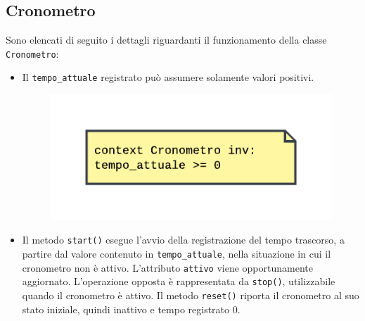\documentclass[11pt, a4paper]{article}
\theoremstyle{definition} %
\begin{document}
\subsection{Cronometro}
Sono elencati di seguito i dettagli riguardanti il funzionamento della
classe \texttt{Cronometro}:
\begin{itemize}
    \item Il \texttt{tempo\_attuale} registrato può assumere solamente
    valori positivi.

    \begin{figure}[H]
    \centering
    \includegraphics[scale = 0.8]{materiale/ocl-tempo.pdf}
    \end{figure}

    \item Il metodo \texttt{start()} esegue l'avvio della registrazione
    del tempo trascorso, a partire dal valore contenuto in
    \texttt{tempo\_attuale}, nella situazione in cui il cronometro non è
    attivo. L'attributo \texttt{attivo} viene opportunamente aggiornato.
    L'operazione opposta è rappresentata da \texttt{stop()}, utilizzabile
    quando il cronometro è attivo. Il
    metodo \texttt{reset()} riporta il cronometro al suo stato iniziale,
    quindi inattivo e tempo registrato 0.


\end{itemize}
\end{document}
